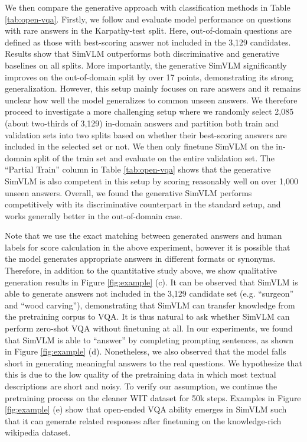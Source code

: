 \documentclass{article} \usepackage{iclr2022_conference,times}
\newcommand{\ours}{SimVLM}
\begin{document}
We then compare the generative approach with classification methods in Table \ref{tab:open-vqa}.
Firstly, we follow \citet{cho2021unifying} and evaluate model performance on questions with rare answers in the Karpathy-test split.
Here, out-of-domain questions are defined as those with best-scoring answer not included in the 3,129 candidates. Results show that {\ours} outperforms both discriminative and generative baselines on all splits.
More importantly, the generative {\ours} significantly improves on the out-of-domain split by over 17 points, demonstrating its strong generalization. However, this setup mainly focuses on rare answers and it remains unclear how well the model generalizes to common unseen answers.
We therefore proceed to investigate a more challenging setup where we randomly select 2,085 (about two-thirds of 3,129) in-domain answers and partition both train and validation sets into two splits based on whether their best-scoring answers are included in the selected set or not. We then only finetune {\ours} on the in-domain split of the train set and evaluate on the entire validation set. The ``Partial Train'' column in Table \ref{tab:open-vqa} shows that the generative {\ours} is also competent in this setup by scoring reasonably well on over 1,000 unseen answers. 
Overall, we found the generative {\ours} performs competitively with its discriminative counterpart in the standard setup, and works generally better in the out-of-domain case.

Note that we use the exact matching between generated answers and human labels for score calculation in the above experiment, however it is possible that the model generates appropriate answers in different formats or synonyms.
Therefore, in addition to the quantitative study above, 
we show qualitative generation results in Figure \ref{fig:example} (c).
It can be observed that {\ours} is able to generate answers not included in the 3,129 candidate set (e.g. ``surgeon'' and ``wood carving''), demonstrating that {\ours} can transfer knowledge from the pretraining corpus to VQA.
It is thus natural to ask whether {\ours} can perform zero-shot VQA without finetuning at all. In our experiments, we found that {\ours} is able to ``answer'' by completing prompting sentences, as shown in Figure \ref{fig:example} (d). Nonetheless, we also observed that the model falls short in generating meaningful answers to the real questions. We hypothesize that this is due to the low quality of the pretraining data in which most textual descriptions are short and noisy. To verify our assumption, we continue the pretraining process on the cleaner WIT dataset \citep{srinivasan2021wit} for 50k steps. Examples in Figure \ref{fig:example} (e) show that open-ended VQA ability emerges in {\ours} such that it can generate related responses after finetuning on the knowledge-rich wikipedia dataset. 
\end{document}
